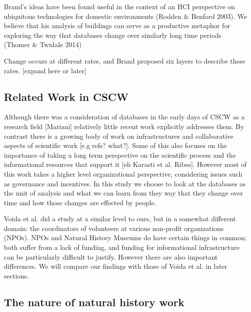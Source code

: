 Brand’s ideas have been found useful in the context of an HCI perspective on ubiquitous technologies for domestic environments (Rodden & Benford 2003).  We believe that his analysis of buildings can serve as a productive metaphor for exploring the way that databases change over similarly long time periods (Thomer & Twidale 2014)

Change occurs at different rates, and Brand proposed six layers to describe these rates. [expand here or later]




\subsection{Related Work in CSCW}

Although there was a consideration of databases in the early days of CSCW as a research field [Mariani] relatively little recent work explicitly addresses them. By contrast there is a growing body of work on infrastructures and collaborative aspects of scientific work [e.g refs? what?]. Some of this also focuses on the importance of taking a long term perspective on the scientific process and the informational resources that support it [eh Karasti et al. Ribes]. However most of this work takes a higher level organizational perspective, considering issues such as governance and incentives. In this study we choose to look at the databases as the unit of analysis and what we can learn from they way that they change over time and how those changes are effected by people.

Voida et al. did a study at a similar level to ours, but in a somewhat different domain: the coordinators of volunteers at various non-profit organizations (NPOs). NPOs and Natural History Museums do have certain things in common; both suffer from a lack of funding, and funding for informational infrastructure can be particularly difficult to justify.  However there are also important differences. We will compare our findings with those of Voida et al. in later sections.

\subsection{The nature of natural history work}

